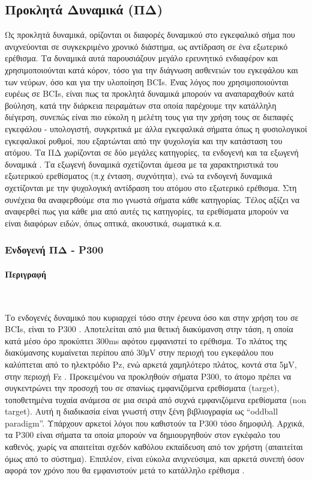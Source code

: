 \documentclass[11pt,a4paper,english,greek,twoside]{../Thesis}
\begin{document}
  \subsection{Προκλητά Δυναμικά (ΠΔ)}  
    \par Ως προκλητά δυναμικά, ορίζονται οι διαφορές δυναμικού στο εγκεφαλικό σήμα που ανιχνεύονται σε συγκεκριμένο χρονικό διάστημα, ως αντίδραση σε ένα εξωτερικό ερέθισμα. Τα δυναμικά αυτά παρουσιάζουν μεγάλο ερευνητικό ενδιαφέρον και χρησιμοποιούνται κατά κόρον, τόσο για την διάγνωση ασθενειών του εγκεφάλου και των νεύρων, όσο και για την υλοποίηση BCIs.  Ένας λόγος που χρησιμοποιούνται ευρέως σε BCIs, είναι πως τα προκλητά δυναμικά μπορούν να αναπαραχθούν κατά βούληση,  κατά την διάρκεια πειραμάτων στα οποία παρέχουμε την κατάλληλη διέγερση, συνεπώς είναι πιο εύκολη η μελέτη τους για την χρήση τους σε διεπαφές εγκεφάλου - υπολογιστή, συγκριτικά με άλλα εγκεφαλικά σήματα όπως η φυσιολογικοί εγκεφαλικοί ρυθμοί, που εξαρτώνται από την ψυχολογία και την κατάσταση του ατόμου.
    Τα ΠΔ χωρίζονται σε δύο μεγάλες κατηγορίες, τα ενδογενή και τα εξωγενή δυναμικά \cite{Sutton1965-nl}.  Τα εξωγενή δυναμικά σχετίζονται άμεσα με τα χαρακτηριστικά του εξωτερικού ερεθίσματος (π.χ ένταση, συχνότητα), ενώ τα ενδογενή δυναμικά σχετίζονται με την ψυχολογική αντίδραση του ατόμου στο εξωτερικό ερέθισμα. Στη συνέχεια θα αναφερθούμε στα πιο γνωστά σήματα κάθε κατηγορίας. Τέλος αξίζει να αναφερθεί πως για κάθε μια από αυτές τις κατηγορίες, τα ερεθίσματα μπορούν να είναι διαφόρων ειδών, όπως οπτικά, ακουστικά, σωματικά κ.α.
    \subsubsection{Ενδογενή ΠΔ - P300}  
      \paragraph{Περιγραφή} ~\\
      \par Το ενδογενές δυναμικό που κυριαρχεί τόσο στην έρευνα όσο και στην χρήση του σε BCIs, είναι το P300 \cite{Gordeev2007-pu}. Αποτελείται από μια θετική διακύμανση στην τάση, η οποία κατά μέσο όρο προκύπτει 300ms αφότου εμφανιστεί το ερέθισμα. Το πλάτος της διακύμανσης κυμαίνεται περίπου από 30μV στην περιοχή του εγκεφάλου που καλύπτεται από το ηλεκτρόδιο Pz, ενώ αρκετά χαμηλότερο πλάτος, κοντά στα 5μV, στην περιοχή Fz \cite{Perlman2013-sg}. Προκειμένου να προκληθούν σήματα P300, το άτομο πρέπει να συγκεντρώνει την προσοχή του σε σπανίως εμφανιζόμενα ερεθίσματα (target), τοποθετημένα τυχαία ανάμεσα σε μια σειρά από συχνά εμφανιζόμενα ερεθίσματα (non target). Αυτή η διαδικασία είναι γνωστή στην ξένη βιβλιογραφία ως “oddball paradigm”. Υπάρχουν αρκετοί λόγοι που καθιστούν τα P300 τόσο δημοφιλή. Αρχικά, τα P300 είναι σήματα τα οποία μπορούν να δημιουργηθούν στον εγκέφαλο του καθενός, χωρίς να απαιτείται σχεδόν καθόλου εκπαίδευση από τον χρήστη (απαιτείται όμως από το σύστημα). Επιπλέον, είναι εύκολα ανιχνεύσιμα, και αρκετά συνεπή όσον αφορά τον χρόνο που θα εμφανιστούν μετά το κατάλληλο ερέθισμα \cite{Fazel-Rezai2012-mk}. 
      
\end{document}
